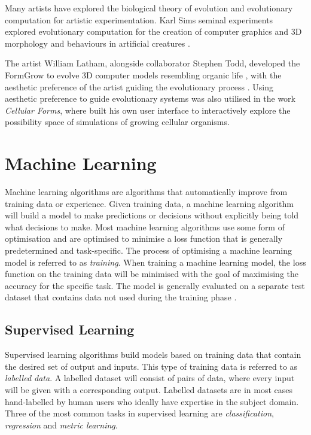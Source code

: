 Many artists have explored the biological theory of evolution and evolutionary computation for artistic experimentation.
Karl Sims seminal experiments explored evolutionary computation for the creation of computer graphics \citep{sims1991artificial} and 3D morphology and behaviours in artificial creatures \citep{sims1994evolving, sims2023evolving}.

The artist William Latham, alongside collaborator Stephen Todd, developed the FormGrow to evolve 3D computer models resembling organic life \citep{latham1992evolutionary}, with the aesthetic preference of the artist guiding the evolutionary process \citep{lambert2013emergence}.
Using aesthetic preference to guide evolutionary systems was also utilised in the work \textit{Cellular Forms}, where \cite{lomas2014cellular} built his own user interface to interactively explore the possibility space of simulations of growing cellular organisms.

\section{Machine Learning}
\label{c2:sec:ml}
Machine learning algorithms are algorithms that automatically improve from training data or experience. 
Given training data, a machine learning algorithm will build a model to make predictions or decisions without explicitly being told what decisions to make. 
Most machine learning algorithms use some form of optimisation and are optimised to minimise a loss function that is generally predetermined and task-specific. 
The process of optimising a machine learning model is referred to as \emph{training}. 
When training a machine learning model, the loss function on the training data will be minimised with the goal of maximising the accuracy for the specific task. 
The model is generally evaluated on a separate test dataset that contains data not used during the training phase \citep{murphy2012machine}.

\subsection{Supervised Learning}

Supervised learning algorithms build models based on training data that contain the desired set of output and inputs. 
This type of training data is referred to as \emph{labelled data}. 
A labelled dataset will consist of pairs of data, where every input will be given with a corresponding output. 
Labelled datasets are in most cases hand-labelled by human users who ideally have expertise in the subject domain.
Three of the most common tasks in supervised learning are \emph{classification}, \emph{regression} and \emph{metric learning}. 


